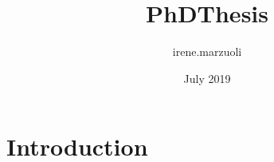 \documentclass{article}
\title{PhDThesis}
\author{irene.marzuoli }
\date{July 2019}
\begin{document}
\maketitle

\section{Introduction}
\end{document}
